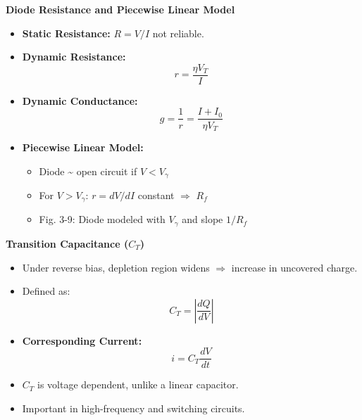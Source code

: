 \begin{frame}{\textbf{Diode Resistance and Piecewise Linear Model}}
    \begin{itemize}
        \item \textbf{Static Resistance:} $R = V/I$ \textemdash{} not reliable.
        \item \textbf{Dynamic Resistance:}
        \begin{equation*}
            r = \frac{\eta V_T}{I}
        \end{equation*}
        \item \textbf{Dynamic Conductance:}
        \begin{equation*}
            g = \frac{1}{r} = \frac{I + I_0}{\eta V_T}
        \end{equation*}
        \item \textbf{Piecewise Linear Model:}
        \begin{itemize}
            \item Diode \textasciitilde{} open circuit if $V < V_\gamma$
            \item For $V > V_\gamma$: $r = dV/dI$ constant $\Rightarrow$ $R_f$
            \item Fig. 3-9: Diode modeled with $V_\gamma$ and slope $1/R_f$
        \end{itemize}
    \end{itemize}
\end{frame}

\begin{frame}{\textbf{Transition Capacitance ($C_T$)}}
    \begin{itemize}
        \item Under reverse bias, depletion region widens $\Rightarrow$ increase in uncovered charge.
        \item Defined as:
        \begin{equation*}
            C_T = \left| \frac{dQ}{dV} \right|
        \end{equation*}
        \item \textbf{Corresponding Current:}
        \begin{equation*}
            i = C_T \frac{dV}{dt}
        \end{equation*}
        \item $C_T$ is voltage dependent, unlike a linear capacitor.
        \item Important in high-frequency and switching circuits.
    \end{itemize}
\end{frame}


